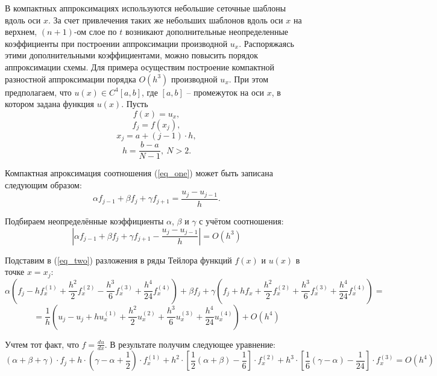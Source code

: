 \documentclass{article}
\begin{document}
В компактных аппроксимациях используются небольшие сеточные шаблоны вдоль оси $x$. За счет привлечения таких же небольших шаблонов вдоль оси $x$ на верхнем, $(n + 1)$-ом слое по $t$ возникают дополнительные неопределенные коэффициенты при построении аппроксимации производной $u_x$. Распоряжаясь этими дополнительными коэффициентами, можно повысить порядок аппроксимации схемы. Для примера осуществим построение компактной разностной аппроксимации порядка $O(h^3)$ производной $u_x$. При этом предполагаем, что $u(x) \in C^4[a, b]$, где $[a, b]$ – промежуток на оси $x$, в котором задана функция $u(x)$. Пусть \begin{equation}
\label{eq_one}
    f(x) = u_x,
\end{equation}
$$ f_j = f(x_j), $$
$$ x_j = a + ( j - 1 ) \cdot h, $$
$$ h = \frac{ b - a }{ N - 1 }, \: N > 2. $$

Компактная апроксимация соотношения (\ref{eq_one}) может быть записана следующим образом:
\begin{equation}
\label{eq_two}
    \alpha f_{j-1} + \beta f_j + \gamma f_{j+1} = \frac{u_j-u_{j-1}}{h}.
\end{equation}

Подбираем неопределённые коэффициенты $\alpha$, $\beta$ и $\gamma$ с учётом соотношения:
\begin{equation}
\label{eq_three}
    \left| \alpha f_{j-1} + \beta f_j + \gamma f_{j+1} - \frac{u_j-u_{j-1}}{h} \right| = O(h^3)
\end{equation}

Подставим в (\ref{eq_two}) разложения в ряды Тейлора функций $f(x)$ и $u(x)$ в точке $x = x_j$:
$$  \alpha \left( f_j - h f^{(1)}_x + \frac{h^2}{2} f^{(2)}_x - \frac{h^3}{6} f^{(3)}_x + \frac{h^4}{24} f^{(4)}_x \right) + \beta f_j + \gamma \left( f_j + h f_x + \frac{h^2}{2} f^{(2)}_x + \frac{h^3}{6} f^{(3)}_x + \frac{h^4}{24} f^{(4)}_x \right) = $$
$$  {} = \frac{1}{h} \left( u_j - u_j + h u^{(1)}_x + \frac{h^2}{2} u^{(2)}_x + \frac{h^3}{6} u^{(3)}_x + \frac{h^4}{24} u^{(4)}_x \right) + O(h^4) $$

Учтем тот факт, что $f = \frac{du}{dx}$. В результате получим следующее уравнение:
\begin{equation}
\label{eq_four}
    \left( \alpha + \beta + \gamma \right) \cdot f_j+  h \cdot \left( \gamma - \alpha + \frac{1}{2} \right) \cdot f^{(1)}_x + h^2 \cdot \left[ \frac{1}{2} ( \alpha + \beta ) - \frac{1}{6}\right] \cdot f^{(2)}_x + h^3 \cdot \left[ \frac{1}{6} ( \gamma  - \alpha ) - \frac{1}{24} \right] \cdot f^{(3)}_x = O(h^4)
\end{equation}
\end{document}
